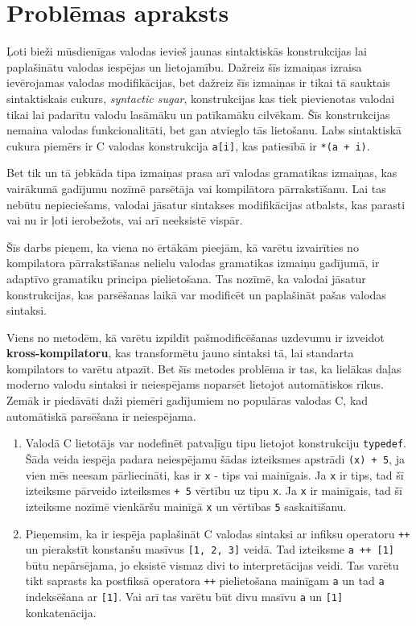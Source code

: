 \section{Problēmas apraksts}
Ļoti bieži mūsdienīgas valodas ievieš jaunas sintaktiskās konstrukcijas lai paplašinātu valodas iespējas un lietojamību. Dažreiz šīs izmaiņas izraisa ievērojamas valodas modifikācijas, bet dažreiz šīs izmaiņas ir tikai tā sauktais sintaktiskais cukurs, \emph{syntactic sugar}, konstrukcijas kas tiek pievienotas valodai tikai lai padarītu valodu lasāmāku un patīkamāku cilvēkam. Šīs konstrukcijas nemaina valodas funkcionalitāti, bet gan atvieglo tās lietošanu. Labs sintaktiskā cukura piemērs ir C valodas konstrukcija \verb|a[i]|, kas patiesībā ir \verb|*(a + i)|.

Bet tik un tā jebkāda tipa izmaiņas prasa arī valodas gramatikas izmaiņas, kas vairākumā gadījumu nozīmē parsētāja vai kompilātora pārrakstīšanu. Lai tas nebūtu nepieciešams, valodai jāsatur sintakses modifikācijas atbalsts, kas parasti vai nu ir ļoti ierobežots, vai arī neeksistē vispār.

Šīs darbs pieņem, ka viena no ērtākām pieejām, kā varētu izvairīties no kompilatora pārrakstīšanas nelielu valodas gramatikas izmaiņu gadījumā, ir adaptīvo gramatiku principa pielietošana. Tas nozīmē, ka valodai jāsatur konstrukcijas, kas parsēšanas laikā var modificēt un paplašināt pašas valodas sintaksi. 

Viens no metodēm, kā varētu izpildīt pašmodificēšanas uzdevumu ir izveidot \textbf{kross-kompilatoru}, kas transformētu jauno sintaksi tā, lai standarta kompilators to varētu atpazīt. Bet šīs metodes problēma ir tas, ka lielākas daļas moderno valodu sintaksi ir neiespējams noparsēt lietojot automātiskos rīkus. Zemāk ir piedāvāti daži piemēri gadījumiem no populāras valodas C, kad automātiskā parsēšana ir neiespējama.

\begin{enumerate}
\item
Valodā C lietotājs var nodefinēt patvaļīgu tipu lietojot konstrukciju \verb|typedef|. Šāda veida iespēja padara neiespējamu šādas izteiksmes apstrādi \verb|(x) + 5|, ja vien mēs neesam pārliecināti, kas ir \verb|x| - tips vai mainīgais. Ja \verb|x| ir tips, tad šī izteiksme pārveido izteiksmes \verb|+ 5| vērtību uz tipu \verb|x|. Ja \verb|x| ir mainīgais, tad šī izteiksme nozīmē vienkāršu mainīgā \verb|x| un vērtības \verb|5| saskaitīšanu. 
\item
Pieņemsim, ka ir iespēja paplašināt C valodas sintaksi ar infiksu operatoru \verb|++| un pierakstīt konstanšu masīvus \verb|[1, 2, 3]| veidā. Tad izteiksme \verb|a ++ [1]| būtu nepārsējama, jo eksistē vismaz divi to interpretācijas veidi. Tas varētu tikt saprasts ka postfiksā operatora \verb|++| pielietošana mainīgam \verb|a| un tad \verb|a| indeksēšana ar \verb|[1]|. Vai arī tas varētu būt divu masīvu \verb|a| un \verb|[1]| konkatenācija.
\end{enumerate}


